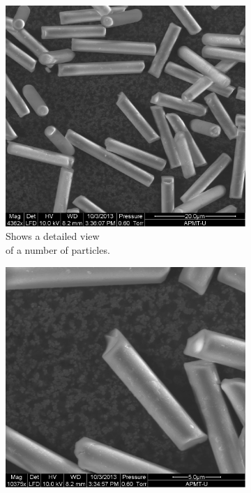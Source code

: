 \begin{figure}[H]
\centering
\begin{subfigure}[3a]{0.40\textwidth}
\includegraphics[width=\textwidth]{figures/method/semizoomed.png}
\caption{Shows a detailed view \\ of a number of particles.}
\end{subfigure}\hspace{1em}%
\begin{subfigure}[3b]{0.40\textwidth}
\includegraphics[width=\textwidth]{figures/method/zoomedbroken.png}

\end{subfigure}
\end{figure}
